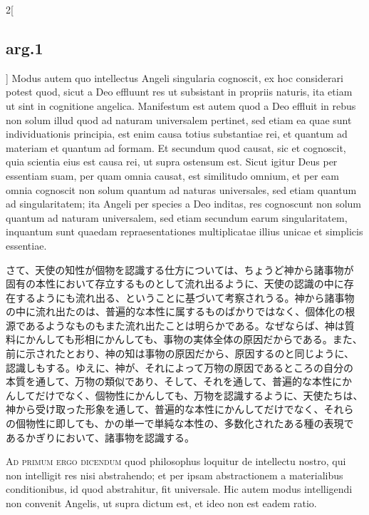 \documentclass[paper=a4paper,fontsize=10pt,jafontsize=9pt,titlepage]{jlreq}
\begin{document}
\begin{paracol}{2}[\subsection{arg.1}]
Modus autem quo intellectus Angeli singularia cognoscit, ex hoc
considerari potest quod, sicut a Deo effluunt res ut subsistant in
propriis naturis, ita etiam ut sint in cognitione angelica. Manifestum
est autem quod a Deo effluit in rebus non solum illud quod ad naturam
universalem pertinet, sed etiam ea quae sunt individuationis
principia, est enim causa totius substantiae rei, et quantum ad
materiam et quantum ad formam. Et secundum quod causat, sic et
cognoscit, quia scientia eius est causa rei, ut supra ostensum
est. Sicut igitur Deus per essentiam suam, per quam omnia causat, est
similitudo omnium, et per eam omnia cognoscit non solum quantum ad
naturas universales, sed etiam quantum ad singularitatem; ita Angeli
per species a Deo inditas, res cognoscunt non solum quantum ad naturam
universalem, sed etiam secundum earum singularitatem, inquantum sunt
quaedam repraesentationes multiplicatae illius unicae et simplicis
essentiae.

\switchcolumn

さて、天使の知性が個物を認識する仕方については、ちょうど神から諸事物が
固有の本性において存立するものとして流れ出るように、天使の認識の中に存
在するようにも流れ出る、ということに基づいて考察されうる。神から諸事物
の中に流れ出たのは、普遍的な本性に属するものばかりではなく、個体化の根
源であるようなものもまた流れ出たことは明らかである。なぜならば、神は質
料にかんしても形相にかんしても、事物の実体全体の原因だからである。また、
前に示されたとおり、神の知は事物の原因だから、原因するのと同じように、
認識しもする。ゆえに、神が、それによって万物の原因であるところの自分の
本質を通して、万物の類似であり、そして、それを通して、普遍的な本性にか
んしてだけでなく、個物性にかんしても、万物を認識するように、天使たちは、
神から受け取った形象を通して、普遍的な本性にかんしてだけでなく、それら
の個物性に即しても、かの単一で単純な本性の、多数化されたある種の表現で
あるかぎりにおいて、諸事物を認識する。

\switchcolumn*[\subsection{ad.1}]

{\scshape Ad primum ergo dicendum} quod philosophus loquitur de
intellectu nostro, qui non intelligit res nisi abstrahendo; et per
ipsam abstractionem a materialibus conditionibus, id quod abstrahitur,
fit universale. Hic autem modus intelligendi non convenit Angelis, ut
supra dictum est, et ideo non est eadem ratio.

\switchcolumn


\end{paracol}
\end{document}
